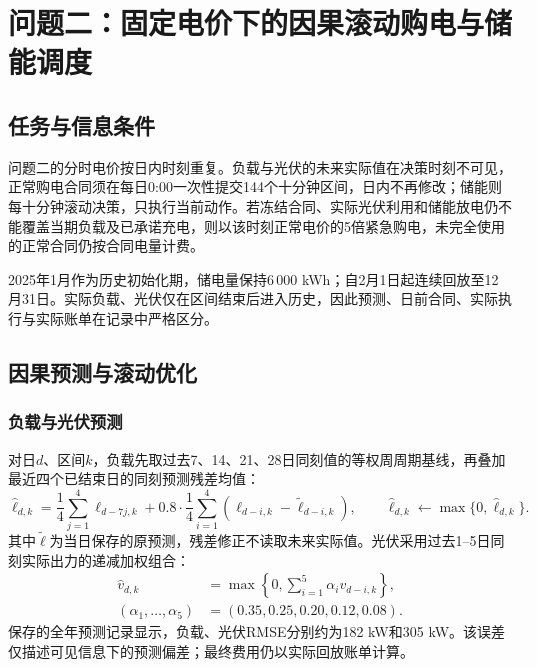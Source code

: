 \section{问题二：固定电价下的因果滚动购电与储能调度}
\label{sec:q2}

\subsection{任务与信息条件}
问题二的分时电价按日内时刻重复。负载与光伏的未来实际值在决策时刻不可见，正常购电合同须在每日0:00一次性提交144个十分钟区间，日内不再修改；储能则每十分钟滚动决策，只执行当前动作。若冻结合同、实际光伏利用和储能放电仍不能覆盖当期负载及已承诺充电，则以该时刻正常电价的5倍紧急购电，未完全使用的正常合同仍按合同电量计费。

2025年1月作为历史初始化期，储电量保持6\,000 kWh；自2月1日起连续回放至12月31日。实际负载、光伏仅在区间结束后进入历史，因此预测、日前合同、实际执行与实际账单在记录中严格区分。

\subsection{因果预测与滚动优化}
\subsubsection{负载与光伏预测}
对日$d$、区间$k$，负载先取过去7、14、21、28日同刻值的等权周周期基线，再叠加最近四个已结束日的同刻预测残差均值：
\begin{equation}
 \widehat\ell_{d,k}=
 \frac14\sum_{j=1}^{4}\ell_{d-7j,k}
 +0.8\cdot\frac14\sum_{i=1}^{4}
 \left(\ell_{d-i,k}-\widetilde\ell_{d-i,k}\right),\qquad
 \widehat\ell_{d,k}\leftarrow\max\{0,\widehat\ell_{d,k}\}.
 \label{eq:q2-load-forecast}
\end{equation}
其中$\widetilde\ell$为当日保存的原预测，残差修正不读取未来实际值。光伏采用过去1--5日同刻实际出力的递减加权组合：
\begin{equation}
 \begin{aligned}
 \widehat v_{d,k}&=\max\left\{0,\sum_{i=1}^{5}\alpha_i v_{d-i,k}\right\},\\
 (\alpha_1,\ldots,\alpha_5)&=(0.35,0.25,0.20,0.12,0.08).
 \end{aligned}
 \label{eq:q2-pv-forecast}
\end{equation}
保存的全年预测记录显示，负载、光伏RMSE分别约为182 kW和305 kW。该误差仅描述可见信息下的预测偏差；最终费用仍以实际回放账单计算。

